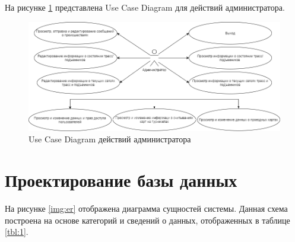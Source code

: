 На рисунке \ref{img:use_case4} представлена Use Case Diagram для действий администратора.

\begin{figure}[h!]
	\begin{center}
		\includegraphics[scale=0.5]{../imgs/use_case/use-case4.png}
	\end{center}
	\captionsetup{justification=centering}
	\caption{Use Case Diagram действий администратора}
	\label{img:use_case4}
\end{figure}



\section{Проектирование базы данных}


На рисунке \ref{img:er} отображена диаграмма сущностей системы. Данная схема построена на основе категорий и сведений о данных, отображенных в таблице \ref{tbl:1}.

